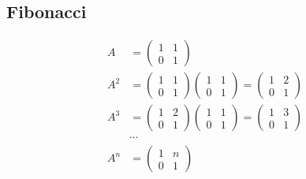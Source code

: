 \documentclass[12pt]{article}
\theoremstyle{definition}
\begin{document}
			\subsection*{Fibonacci}
				\[\begin{aligned}
				A\ &=\begin{pmatrix}
					1	&	1	\\
					0	&	1	
				\end{pmatrix}\\
				A^2&= \begin{pmatrix}
					1	&	1	\\
					0	&	1	
				\end{pmatrix} \begin{pmatrix}
					1	&	1	\\
					0	&	1	
				\end{pmatrix}=\begin{pmatrix}
					1	&	2	\\
					0	&	1	
				\end{pmatrix}\\
				A^3&=\begin{pmatrix}
					1	&	2	\\
					0	&	1	
				\end{pmatrix} \begin{pmatrix}
					1	&	1	\\
					0	&	1	
				\end{pmatrix}=\begin{pmatrix}
					1	&	3	\\
					0	&	1	
				\end{pmatrix}\\
				&\cdots\\
				A^n&=\begin{pmatrix}
					1	&	n	\\
					0	&	1	
				\end{pmatrix}\\
				\end{aligned}\]
				
\end{document}

